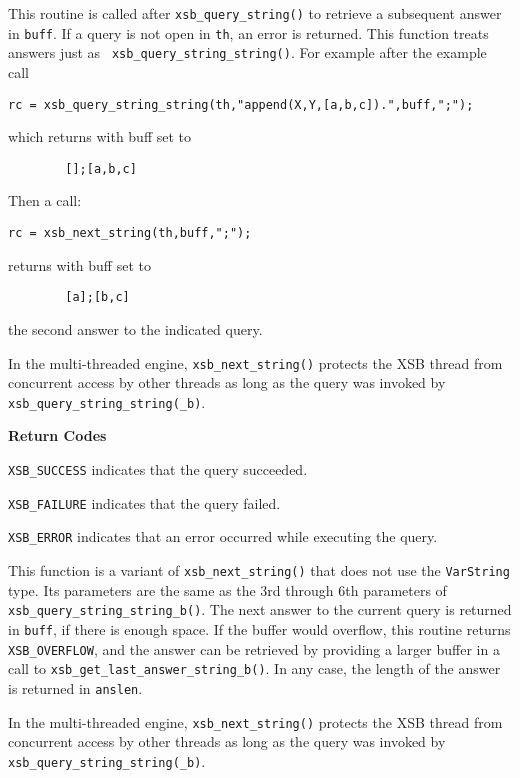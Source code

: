 \begin{description}
%
This routine is called after {\tt xsb\_query\_string()} to retrieve a
subsequent answer in {\tt buff}.  If a query is not open in {\tt th},
an error is returned.  This function treats answers just as {\tt
  xsb\_query\_string\_string()}.  For example after the example call
\begin{verbatim}
rc = xsb_query_string_string(th,"append(X,Y,[a,b,c]).",buff,";");
\end{verbatim}
which returns with buff set to 
\begin{verbatim}
        [];[a,b,c]
\end{verbatim}
Then a call:
\begin{verbatim}
rc = xsb_next_string(th,buff,";");
\end{verbatim}
returns with buff set to 
\begin{verbatim}
        [a];[b,c]
\end{verbatim}
the second answer to the indicated query. 

In the multi-threaded engine, {\tt xsb\_next\_string()} protects the
XSB thread from concurrent access by other threads as long as the
query was invoked by {\tt xsb\_query\_string\_string(\_b)}.

{\bf Return Codes}  
\bi
\item {\tt XSB\_SUCCESS} indicates that the query succeeded.
%
\item {\tt XSB\_FAILURE} indicates that the query failed.
%
\item {\tt XSB\_ERROR} indicates that an error occurred while
  executing the query.  
%
\ei

%
This function is a variant of {\tt xsb\_next\_string()} that does not
use the {\tt VarString} type.  Its parameters are the same as the 3rd
through 6th parameters of {\tt xsb\_query\_string\_string\_b()}.  The
next answer to the current query is returned in \verb|buff|, if there
is enough space.  If the buffer would overflow, this routine returns
{\tt XSB\_OVERFLOW}, and the answer can be retrieved by providing a
larger buffer in a call to {\tt xsb\_get\_last\_answer\_string\_b()}.
In any case, the length of the answer is returned in \verb|anslen|.

In the multi-threaded engine, {\tt xsb\_next\_string()} protects the
XSB thread from concurrent access by other threads as long as the
query was invoked by {\tt xsb\_query\_string\_string(\_b)}.


\end{description}
